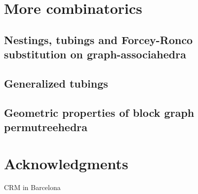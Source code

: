 \documentclass{amsart}
\theoremstyle{definition}
\begin{document}

\appendix

\section{More combinatorics}


\subsection{Nestings, tubings and Forcey-Ronco substitution on graph-associahedra}


\subsection{Generalized tubings}


\subsection{Geometric properties of block graph permutreehedra}







\section*{Acknowledgments}

CRM in Barcelona 



\label{sec:biblio}
\end{document}
